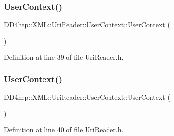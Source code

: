 \subsubsection{\texorpdfstring{User\+Context()}{UserContext()}\hspace{0.1cm}{\footnotesize\ttfamily [1/2]}}
{\footnotesize\ttfamily D\+D4hep\+::\+X\+M\+L\+::\+Uri\+Reader\+::\+User\+Context\+::\+User\+Context (\begin{DoxyParamCaption}{ }\end{DoxyParamCaption})\hspace{0.3cm}{\ttfamily [inline]}}



Definition at line 39 of file Uri\+Reader.\+h.

\hypertarget{struct_d_d4hep_1_1_x_m_l_1_1_uri_reader_1_1_user_context_a3597e8269b9454ec60a49b9611a5b002}{}\label{struct_d_d4hep_1_1_x_m_l_1_1_uri_reader_1_1_user_context_a3597e8269b9454ec60a49b9611a5b002} 
\subsubsection{\texorpdfstring{User\+Context()}{UserContext()}\hspace{0.1cm}{\footnotesize\ttfamily [2/2]}}
{\footnotesize\ttfamily D\+D4hep\+::\+X\+M\+L\+::\+Uri\+Reader\+::\+User\+Context\+::\+User\+Context (\begin{DoxyParamCaption}\item[{const \hyperlink{struct_d_d4hep_1_1_x_m_l_1_1_uri_reader_1_1_user_context}{User\+Context} \&}]{ }\end{DoxyParamCaption})\hspace{0.3cm}{\ttfamily [inline]}}



Definition at line 40 of file Uri\+Reader.\+h.

\hypertarget{struct_d_d4hep_1_1_x_m_l_1_1_uri_reader_1_1_user_context_afabe7889ca4e26019a3108850361287e}{}\label{struct_d_d4hep_1_1_x_m_l_1_1_uri_reader_1_1_user_context_afabe7889ca4e26019a3108850361287e} 
